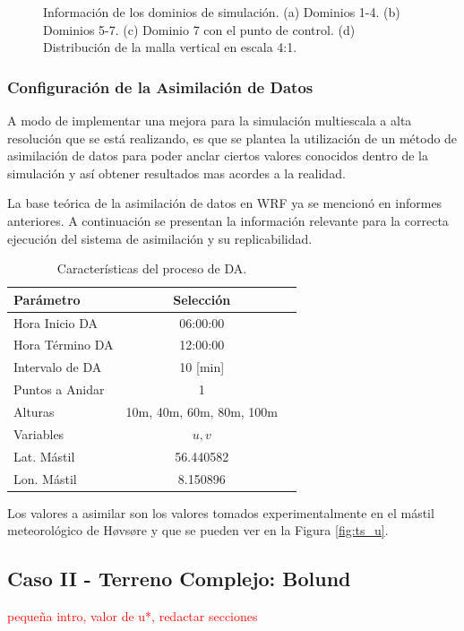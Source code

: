 \begin{figure}[H]
	\caption{Información de los dominios de simulación. (a) Dominios 1-4. (b) Dominios 5-7. (c) Dominio 7 con el punto de control. (d) Distribución de la malla vertical en escala 4:1.}
	\label{fig:05_dom_hov}
\end{figure}

\subsubsection{Configuración de la Asimilación de Datos}
A modo de implementar una mejora para la simulación multiescala a alta resolución que se está realizando, es que se plantea la utilización de un método de asimilación de datos para poder anclar ciertos valores conocidos dentro de la simulación y así obtener resultados mas acordes a la realidad.

La base teórica de la asimilación de datos en WRF ya se mencionó en informes anteriores. A continuación se presentan la información relevante para la correcta ejecución del sistema de asimilación y su replicabilidad.

\begin{table}[h!]
	\caption{Características del proceso de DA.}\label{tab:05_config_da_hov}
	\centering\footnotesize
	\begin{tabular}{lcc}
		\toprule
		Parámetro & Selección \\
		\midrule
		Hora Inicio	DA 	 & 06:00:00   \\
		Hora Término DA	 		 & 12:00:00  \\
		Intervalo de DA	&	10 [min] \\
		Puntos a Anidar	 	 & 1   \\
		Alturas 	& 10m, 40m, 60m, 80m, 100m \\
		Variables	& $u,v$   \\
		Lat. Mástil	& 56.440582   \\
		Lon. Mástil	& 8.150896   \\
		
		\bottomrule
	\end{tabular}
\end{table}

Los valores a asimilar son los valores tomados experimentalmente en el mástil meteorológico de Høvsøre y que se pueden ver en la Figura \ref{fig:ts_u}.

\newpage
\subsection{Caso II - Terreno Complejo: Bolund}
\textcolor{red}{pequeña intro, valor de u*, redactar secciones}

